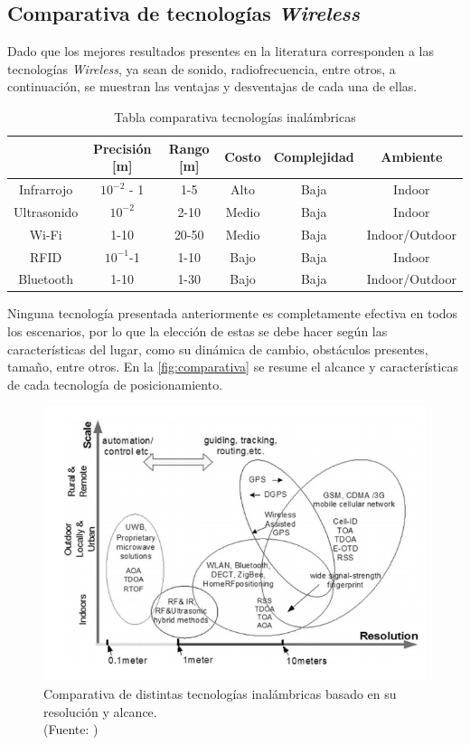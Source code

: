 \subsection{Comparativa de tecnologías \textit{Wireless}}

Dado que los mejores resultados presentes en la literatura corresponden a las tecnologías \textit{Wireless}, ya sean de sonido, radiofrecuencia, entre otros, a continuación, se muestran las ventajas y desventajas de cada una de ellas.

\begin{table}[!ht]
\centering
\caption[Comparativa Tecnologías Inalámbricas]{Tabla comparativa tecnologías inalámbricas}
\label{my-label}
\begin{tabular}{|c|c|c|c|c|c|}
\hline
            & Precisión {[}m{]}             & Rango {[}m{]} & Costo & Complejidad & Ambiente       \\ \hline
Infrarrojo  & \(10^{-2}\) - 1 & 1-5           & Alto  & Baja        & Indoor         \\ \hline
Ultrasonido & \(10^{-2}\)     & 2-10          & Medio & Baja        & Indoor         \\ \hline
Wi-Fi       & 1-10                          & 20-50         & Medio & Baja        & Indoor/Outdoor \\ \hline
RFID        & \(10^{-1}\)-1   & 1-10          & Bajo  & Baja        & Indoor         \\ \hline
Bluetooth   & 1-10                          & 1-30          & Bajo  & Baja        & Indoor/Outdoor \\ \hline
\end{tabular}
\end{table}

Ninguna tecnología presentada anteriormente es completamente efectiva en todos los escenarios, por lo que la elección de estas se debe hacer según las características del lugar, como su dinámica de cambio, obstáculos presentes, tamaño, entre otros. En la \autoref{fig:comparativa} se resume el alcance y características de cada tecnología de posicionamiento.


\begin{figure}[!ht]
\centering
\includegraphics[width=.6\textwidth]{figures/comparativa.png}
\caption[Comparativa tecnologías inalámbricas]{Comparativa de distintas tecnologías inalámbricas basado en su resolución y alcance.\\
{\scriptsize (Fuente: \citep{Liu:2007:SWI:2220431.2221077})}}
\label{fig:comparativa}
\end{figure}



